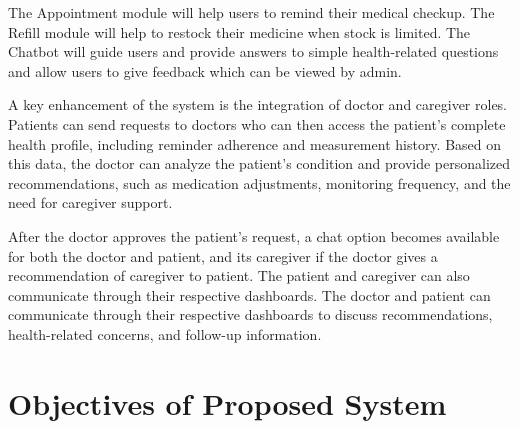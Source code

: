 The Appointment module will help users to remind their medical checkup. The Refill module will help to restock their medicine when stock is limited. The Chatbot will guide users and provide answers to simple health-related questions and allow users to give feedback which can be viewed by admin.

A key enhancement of the system is the integration of doctor and caregiver roles. Patients can send requests to doctors who can then access the patient's complete health profile, including reminder adherence and measurement history. Based on this data, the doctor can analyze the patient's condition and provide personalized recommendations, such as medication adjustments, monitoring frequency, and the need for caregiver support.

After the doctor approves the patient's request, a chat option becomes available for both the doctor and patient, and its caregiver if the doctor gives a recommendation of caregiver to patient. The patient and caregiver can also communicate through their respective dashboards. The doctor and patient can communicate through their respective dashboards to discuss recommendations, health-related concerns, and follow-up information.

\section{Objectives of Proposed System}
\label{sec:objectives}


